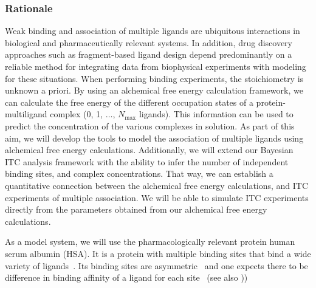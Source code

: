 \documentclass[10pt,final]{article}
\begin{document}
\subsubsection*{Rationale}
Weak binding and association of multiple ligands are ubiquitous interactions in biological and pharmaceutically relevant systems.
%
In addition, drug discovery approaches such as fragment-based ligand design depend predominantly on a reliable method for integrating data from biophysical experiments with modeling for these situations.
%
When performing binding experiments, the stoichiometry is unknown a priori.
%
By using an alchemical free energy calculation framework, we can calculate the free energy of the different occupation states of a protein-multiligand complex (0, 1, $\dots$, $N_\mathrm{max}$ ligands).
%
This information can be used to predict the concentration of the various complexes in solution.
%
As part of this aim, we will develop the tools to model the association of multiple ligands using alchemical free energy calculations.
%
Additionally, we will extend our Bayesian ITC analysis framework with the ability to infer the number of independent binding sites, and complex concentrations.
%
That way, we can establish a quantitative connection between the alchemical free energy calculations, and ITC experiments of multiple association.
%
We will be able to simulate ITC experiments directly from the parameters obtained from our alchemical free energy calculations.

As a model system, we will use the pharmacologically relevant protein human serum albumin (HSA).
%
It is a protein with multiple binding sites that bind a wide variety of ligands~\cite{He1992a,Kragh-Hansen2002a,Sulkowska2002a}.
%
Its binding sites are asymmetric~\cite{He1992a, Curry1998a} and one expects there to be difference in binding affinity of a ligand for each site~\cite{Sudlow1976a} (see also ))
\end{document}
